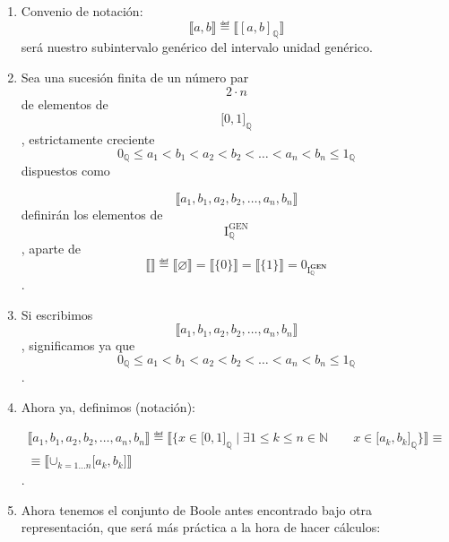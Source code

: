\begin{enumerate}
\begin{enumerate}
\begin{enumerate}
      \[\begin{array}{l}
      {\forall{⟦A⟧},{{⟦B⟧} \in \mathbf{\mathrm{I}}_{\mathbb{Q}}^{\mathbf{GEN}}}\mspace{72mu}{{⟦A⟧} + {⟦B⟧}}≝{⟦{A \cup B}⟧}} \\
      {\forall{⟦A⟧},{{⟦B⟧} \in \mathbf{\mathrm{I}}_{\mathbb{Q}}^{\mathbf{GEN}}}\mspace{72mu}{{⟦A⟧} \cdot {⟦B⟧}}≝{⟦{A \cap B}⟧}} \\
      {\forall{{⟦A⟧} \in \mathbf{\mathrm{I}}_{\mathbb{Q}}^{\mathbf{GEN}}}\mspace{252mu}\overline{⟦A⟧}≝{⟦{\mathbf{\mathrm{I}}_{\mathbb{Q}} \smallsetminus A}⟧}}
      \end{array}\]
    \item
      Convenio de
      notación:\[{⟦{a,b}⟧} ≝ {⟦\left\lbrack {a,b} \right\rbrack_{\mathbb{Q}}⟧}\]será
      nuestro subintervalo genérico del intervalo unidad genéri\-co.
    \item
      Sea una sucesión finita de un número par \[2 \cdot n\] de
      elementos de \[\lbrack 0,1\rbrack_{\mathbb{Q}}\], estricta\-mente
      creciente
      \[{{{{{{{0_{\mathbb{Q}} \leq a_{1}} < b_{1}} < a_{2}} < b_{2}} < \ldots} < a_{n}} < b_{n}} \leq 1_{\mathbb{Q}}\]
      dispuestos como

      \[⟦{a_{1},b_{1},a_{2},b_{2},\ldots,a_{n},b_{n}}⟧\]definirán los
      elementos de
      \[\mathbf{\mathrm{I}}_{\mathbb{Q}}^{\mathbf{\mathrm{GEN}}}\],
      aparte de
      \[{⟦⟧}≝{{⟦\varnothing ⟧} = {⟦{\{ 0\}}⟧} = {⟦{\{ 1\}}⟧} = 0_{\mathbf{\mathrm{I}}_{\mathbb{Q}}^{\mathbf{GEN}}}}\].
    \item
      Si escribimos \[⟦{a_{1},b_{1},a_{2},b_{2},\ldots,a_{n},b_{n}}⟧\],
      significamos ya que
      \[{{{{{{{0_{\mathbb{Q}} \leq a_{1}} < b_{1}} < a_{2}} < b_{2}} < \ldots} < a_{n}} < b_{n}} \leq 1_{\mathbb{Q}}\].
    \item
      Ahora ya, definimos (notación):

      \[\begin{array}{l}
      {{⟦{a_{1},b_{1},a_{2},b_{2},\ldots,a_{n},b_{n}}⟧}≝{{⟦{\{{{x \in {\lbrack 0,1\rbrack}_{\mathbb{Q}}} \mid \exists{1 \leq k \leq n \in {\mathbb{N}}}\qquad{x \in {\lbrack{a_{k},b_{k}}\rbrack}_{\mathbb{Q}}}}\}}⟧} \equiv}} \\
      {\equiv {⟦{\mathbf{\mathrm{\cup}}_{{k = 1.}..n}{\lbrack{a_{k},b_{k}}\rbrack}}⟧}}
      \end{array}\].
    \item
      Ahora tenemos el conjunto de Boole antes encontrado bajo otra
      representación, que será más práctica a la hora de hacer cálculos:


\end{enumerate}
\end{enumerate}
\end{enumerate}
